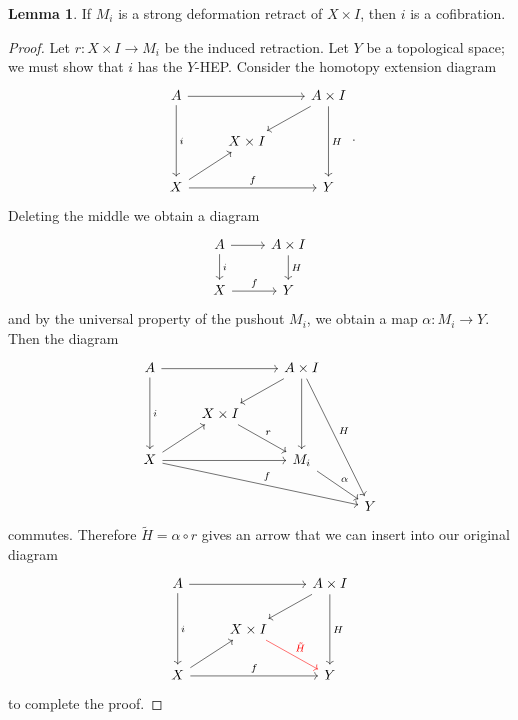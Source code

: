 \documentclass[10pt]{article}
\theoremstyle{definition}
\newtheorem{lemma}{Lemma}[exer]
\begin{document}
\begin{lemma}
If $M_i$ is a strong deformation retract of $X \times I$, then $i$ is a cofibration.
\end{lemma}
\begin{proof}
Let $r: X \times I \to M_i$ be the induced retraction.
Let $Y$ be a topological space; we must show that $i$ has the $Y$-HEP.
Consider the homotopy extension diagram
$$\begin{tikzcd}
A \arrow[rr] \arrow[dd,"i"] && A \times I \arrow[dl] \arrow[dd,"H"]\\
& X \times I \\
X \arrow[ur] \arrow[rr,"f"] && Y
\end{tikzcd}.$$
Deleting the middle we obtain a diagram
$$\begin{tikzcd}
A \arrow[r] \arrow[d,"i"] & A \times I \arrow[d,"H"]\\
X \arrow[r,"f"] & Y
\end{tikzcd}$$
and by the universal property of the pushout $M_i$, we obtain a map $\alpha: M_i \to Y$.
Then the diagram
$$\begin{tikzcd}
A \arrow[rr] \arrow[dd,"i"] && A \times I \arrow[dl] \arrow[dd] \arrow[dddr,"H"]\\
& X \times I \arrow[dr,"r"] \\
X \arrow[ur] \arrow[rr] \arrow[drrr,"f"] && M_i \arrow[dr,"\alpha"]\\
&&& Y
\end{tikzcd}$$
commutes. Therefore $\tilde H = \alpha \circ r$ gives an arrow that we can insert into our original diagram
$$\begin{tikzcd}
A \arrow[rr] \arrow[dd,"i"] && A \times I \arrow[dl] \arrow[dd,"H"]\\
& X \times I \arrow[dr,"\tilde H",color=red] \\
X \arrow[ur] \arrow[rr,"f"] && Y
\end{tikzcd}$$
to complete the proof.
\end{proof}
\end{document}
